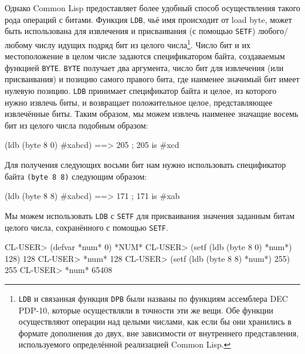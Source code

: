 Однако Common Lisp предоставляет более удобный способ осуществления такого рода операций
с битами. Функция \lstinline{LDB}, чьё имя происходит от load byte, может быть использована
для извлечения и присваивания (с помощью \lstinline{SETF}) любого/любому числу идущих подряд
бит из целого числа\footnote{\lstinline{LDB} и связанная функция \lstinline{DPB} были названы по
  функциям ассемблера DEC PDP-10, которые осуществляли в точности эти же вещи. Обе функции
  осуществляют операции над целыми числами, как если бы они хранились в формате дополнения
  до двух, вне зависимости от внутреннего представления, используемого определённой
  реализацией Common Lisp.}\hspace{\footnotenegspace}. Число бит и их местоположение в целом числе задаются
спецификатором байта, создаваемым функцией \lstinline{BYTE}. \lstinline{BYTE} получает два
аргумента, число бит для извлечения (или присваивания) и позицию самого правого бита, где
наименее значимый бит имеет нулевую позицию. \lstinline{LDB} принимает спецификатор байта и
целое, из которого нужно извлечь биты, и возвращает положительное целое, представляющее
извлечённые биты. Таким образом, мы можем извлечь наименее значащие восемь бит из целого
числа подобным образом:

\begin{myverb}
(ldb (byte 8 0) #xabcd) ==> 205 ; 205 is #xcd
\end{myverb}

Для получения следующих восьми бит нам нужно использовать спецификатор байта
\lstinline{(byte 8 8)} следующим образом:

\begin{myverb}
(ldb (byte 8 8) #xabcd) ==> 171 ; 171 is #xab
\end{myverb}

Мы можем использовать \lstinline{LDB} с \lstinline{SETF} для присваивания значения заданным битам целого
числа, сохранённого с помощью \lstinline{SETF}.

\begin{myverb}
CL-USER> (defvar *num* 0)
*NUM*
CL-USER> (setf (ldb (byte 8 0) *num*) 128)
128
CL-USER> *num*
128
CL-USER> (setf (ldb (byte 8 8) *num*) 255)
255
CL-USER> *num*
65408
\end{myverb}

